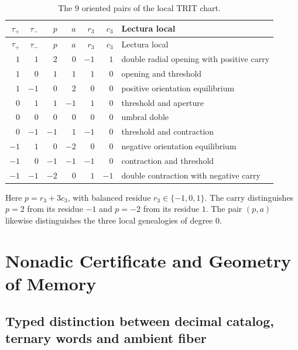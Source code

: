 \begin{longtable}{rrrrrrp{}}
\caption{The \(9\) oriented pairs of the local TRIT chart.}
\label{espiral:tab:ap-nueve-pares}\\
\toprule
\(\tau_+\)&\(\tau_-\)&\(p\)&\(a\)&\(r_3\)&\(c_3\)&Lectura local\\
\midrule
\endfirsthead
\toprule
\(\tau_+\)&\(\tau_-\)&\(p\)&\(a\)&\(r_3\)&\(c_3\)&Lectura local\\
\midrule
\endhead
\( 1\)&\( 1\)&\( 2\)&\( 0\)&\(-1\)&\( 1\)&double radial opening with positive carry\\
\( 1\)&\( 0\)&\( 1\)&\( 1\)&\( 1\)&\( 0\)&opening and threshold\\
\( 1\)&\(-1\)&\( 0\)&\( 2\)&\( 0\)&\( 0\)&positive orientation equilibrium\\
\( 0\)&\( 1\)&\( 1\)&\(-1\)&\( 1\)&\( 0\)&threshold and aperture\\
\( 0\)&\( 0\)&\( 0\)&\( 0\)&\( 0\)&\( 0\)&umbral doble\\
\( 0\)&\(-1\)&\(-1\)&\( 1\)&\(-1\)&\( 0\)&threshold and contraction\\
\(-1\)&\( 1\)&\( 0\)&\(-2\)&\( 0\)&\( 0\)&negative orientation equilibrium\\
\(-1\)&\( 0\)&\(-1\)&\(-1\)&\(-1\)&\( 0\)&contraction and threshold\\
\(-1\)&\(-1\)&\(-2\)&\( 0\)&\( 1\)&\(-1\)&double contraction with negative carry\\
\bottomrule
\end{longtable}

Here \(p=r_3+3c_3\), with balanced residue
\(r_3\in\{-1,0,1\}\). The carry distinguishes \(p=2\) from its residue \(-1\) and
\(p=-2\) from its residue \(1\). The pair
\((p,a)\) likewise distinguishes the three local genealogies of
degree \(0\).

\chapter{Nonadic Certificate and Geometry of Memory}

\section{Typed distinction between decimal catalog, ternary words and ambient fiber}

